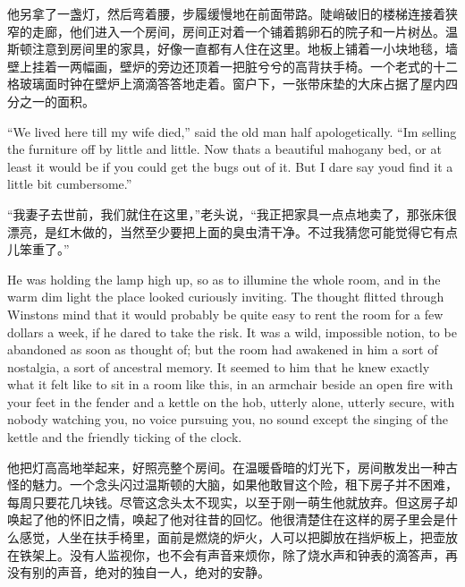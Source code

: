 \begin{paracol}{2}
\switchcolumn

他另拿了一盏灯，然后弯着腰，步履缓慢地在前面带路。陡峭破旧的楼梯连接着狭窄的走廊，他们进入一个房间，房间正对着一个铺着鹅卵石的院子和一片树丛。温斯顿注意到房间里的家具，好像一直都有人住在这里。地板上铺着一小块地毯，墙壁上挂着一两幅画，壁炉的旁边还顶着一把脏兮兮的高背扶手椅。一个老式的十二格玻璃面时钟在壁炉上滴滴答答地走着。窗户下，一张带床垫的大床占据了屋内四分之一的面积。

\switchcolumn*

``We lived here till my wife died,'' said the old man half apologetically.
``I\textquotesingle m selling the furniture off by little and little. Now
that\textquotesingle s a beautiful mahogany bed, or at least it would be
if you could get the bugs out of it. But I dare say
you\textquotesingle d find it a little bit cumbersome.''

\switchcolumn

``我妻子去世前，我们就住在这里，''老头说，``我正把家具一点点地卖了，那张床很漂亮，是红木做的，当然至少要把上面的臭虫清干净。不过我猜您可能觉得它有点儿笨重了。''

\switchcolumn*

He was holding the lamp high up, so as to illumine the whole room, and
in the warm dim light the place looked curiously inviting. The thought
flitted through Winston\textquotesingle s mind that it would probably be
quite easy to rent the room for a few dollars a week, if he dared to
take the risk. It was a wild, impossible notion, to be abandoned as soon
as thought of; but the room had awakened in him a sort of nostalgia, a
sort of ancestral memory. It seemed to him that he knew exactly what it
felt like to sit in a room like this, in an armchair beside an open fire
with your feet in the fender and a kettle on the hob, utterly alone,
utterly secure, with nobody watching you, no voice pursuing you, no
sound except the singing of the kettle and the friendly ticking of the
clock.

\switchcolumn

他把灯高高地举起来，好照亮整个房间。在温暖昏暗的灯光下，房间散发出一种古怪的魅力。一个念头闪过温斯顿的大脑，如果他敢冒这个险，租下房子并不困难，每周只要花几块钱。尽管这念头太不现实，以至于刚一萌生他就放弃。但这房子却唤起了他的怀旧之情，唤起了他对往昔的回忆。他很清楚住在这样的房子里会是什么感觉，人坐在扶手椅里，面前是燃烧的炉火，人可以把脚放在挡炉板上，把壶放在铁架上。没有人监视你，也不会有声音来烦你，除了烧水声和钟表的滴答声，再没有别的声音，绝对的独自一人，绝对的安静。


\end{paracol}
